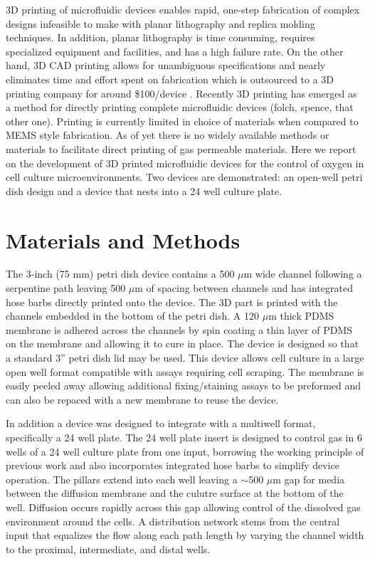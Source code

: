 3D printing of microfluidic devices enables rapid, one-step fabrication of complex designs infeasible to make with planar lithography and replica molding techniques.
In addition, planar lithography is time consuming, requires specialized equipment and facilities, and has a high failure rate.
On the other hand, 3D CAD printing allows for unambiguous specifications and nearly eliminates time and effort spent on fabrication which is outsourced to a 3D printing company for around \$100/device \cite{Au2014,Chen2014}.
Recently 3D printing has emerged as a method for directly printing complete microfluidic devices (folch, spence, that other one). 
Printing is currently limited in choice of materials when compared to MEMS style fabrication. 
As of yet there is no widely available methods or materials to facilitate direct printing of gas permeable materials.
Here we report on the development of 3D printed microfluidic devices for the control of oxygen in cell culture microenvironments.
Two devices are demonstrated: an open-well petri dish design and a device that nests into a 24 well culture plate.

\section*{Materials and Methods}

The 3-inch (75 mm) petri dish device contains a 500 $\mu$m wide channel following a serpentine path leaving 500 $\mu$m of spacing between channels and has integrated hose barbs directly printed onto the device.
The 3D part is printed with the channels embedded in the bottom of the petri dish. 
A 120 $\mu$m thick PDMS membrane is adhered across the channels by spin coating a thin layer of PDMS on the membrane and allowing it to cure in place.
The device is designed so that a standard 3” petri dish lid may be used.
This device allows cell culture in a large open well format compatible with assays requiring cell scraping.
The membrane is easily peeled away allowing additional fixing/staining assays to be preformed and can also be repaced with a new membrane to reuse the device. 

In addition a device was designed to integrate with a multiwell format, specifically a 24 well plate. 
The 24 well plate insert is designed to control gas in 6 wells of a 24 well culture plate from one input, borrowing the working principle of previous work\cite{oppegard2010} and also incorporates integrated hose barbs to simplify device operation.
The pillars extend into each well leaving a $\sim$500 $\mu$m gap for media between the diffusion membrane and the culutre surface at the bottom of the well.
Diffusion occurs rapidly across this gap allowing control of the dissolved gas environment around the cells. 
A distribution network stems from the central input that equalizes the flow along each path length by varying the channel width to the proximal, intermediate, and distal wells.

